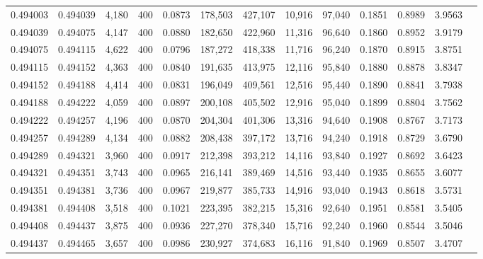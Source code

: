 \begin{tabular}{rrrrrrrrrrrrr}
0.494003 & 0.494039 &  4,180 & 400 &                                     0.0873 & 178,503 & 427,107 &  10,916 &  97,040 & 0.1851 & 0.8989 & 3.9563 \\
0.494039 & 0.494075 &  4,147 & 400 &                                     0.0880 & 182,650 & 422,960 &  11,316 &  96,640 & 0.1860 & 0.8952 & 3.9179 \\
0.494075 & 0.494115 &  4,622 & 400 &                                     0.0796 & 187,272 & 418,338 &  11,716 &  96,240 & 0.1870 & 0.8915 & 3.8751 \\
0.494115 & 0.494152 &  4,363 & 400 &                                     0.0840 & 191,635 & 413,975 &  12,116 &  95,840 & 0.1880 & 0.8878 & 3.8347 \\
0.494152 & 0.494188 &  4,414 & 400 &                                     0.0831 & 196,049 & 409,561 &  12,516 &  95,440 & 0.1890 & 0.8841 & 3.7938 \\
0.494188 & 0.494222 &  4,059 & 400 &                                     0.0897 & 200,108 & 405,502 &  12,916 &  95,040 & 0.1899 & 0.8804 & 3.7562 \\
0.494222 & 0.494257 &  4,196 & 400 &                                     0.0870 & 204,304 & 401,306 &  13,316 &  94,640 & 0.1908 & 0.8767 & 3.7173 \\
0.494257 & 0.494289 &  4,134 & 400 &                                     0.0882 & 208,438 & 397,172 &  13,716 &  94,240 & 0.1918 & 0.8729 & 3.6790 \\
0.494289 & 0.494321 &  3,960 & 400 &                                     0.0917 & 212,398 & 393,212 &  14,116 &  93,840 & 0.1927 & 0.8692 & 3.6423 \\
0.494321 & 0.494351 &  3,743 & 400 &                                     0.0965 & 216,141 & 389,469 &  14,516 &  93,440 & 0.1935 & 0.8655 & 3.6077 \\
0.494351 & 0.494381 &  3,736 & 400 &                                     0.0967 & 219,877 & 385,733 &  14,916 &  93,040 & 0.1943 & 0.8618 & 3.5731 \\
0.494381 & 0.494408 &  3,518 & 400 &                                     0.1021 & 223,395 & 382,215 &  15,316 &  92,640 & 0.1951 & 0.8581 & 3.5405 \\
0.494408 & 0.494437 &  3,875 & 400 &                                     0.0936 & 227,270 & 378,340 &  15,716 &  92,240 & 0.1960 & 0.8544 & 3.5046 \\
0.494437 & 0.494465 &  3,657 & 400 &                                     0.0986 & 230,927 & 374,683 &  16,116 &  91,840 & 0.1969 & 0.8507 & 3.4707 \\

\end{tabular}
